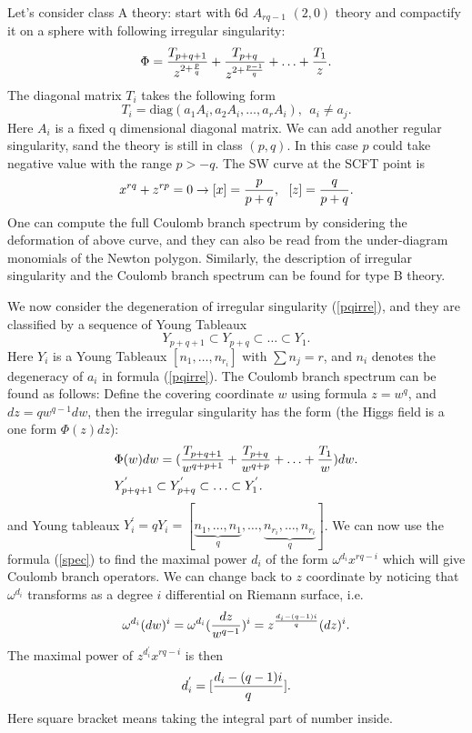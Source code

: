 \documentclass[a4paper,11pt]{article}
\begin{document}
Let's consider class A theory: start with 6d  $A_{rq -1}$ $(2,0)$ theory and compactify it on a sphere with following irregular singularity:
\begin{equation}
\Phi={T_{p+q+1}\over z^{2+{p\over q}}}+{T_{p+q}\over z^{2+{p-1\over q}}}+\ldots+{T_{1}\over z}.
\end{equation}
The diagonal matrix $T_i$ takes the following form
\begin{equation}
T_i=\text{diag}(a_1 A_i, a_2 A_i,\ldots, a_r A_i),~~a_i\neq a_j.
\label{pqirre}
\end{equation}
Here $A_i$ is a fixed q dimensional diagonal matrix. We can add another regular singularity,  sand the theory is 
still in class $(p,q)$. In this case $p$ could take negative value with the range $ p> -q$.  
The SW curve at the SCFT point is 
\begin{equation}
x^{rq}+z^{rp}=0 \rightarrow [x]={p\over p+q},~~[z]={q\over p+q}.
\end{equation}
One can compute the full Coulomb branch spectrum by considering the deformation of above curve, and they can also be read from 
the under-diagram monomials of the Newton polygon.  Similarly, the description of irregular singularity and the Coulomb branch spectrum 
can be found for type B theory. 



We now consider the degeneration of irregular singularity (\ref{pqirre}), and  they are classified by a sequence of Young Tableaux 
\begin{equation}
Y_{p+q+1}\subset Y_{p+q} \subset \ldots \subset Y_1.
\end{equation}
Here $Y_i$ is a  Young Tableaux $[n_1,\ldots, n_{r_i}]$ with $\sum n_j= r$, and $n_i$ denotes the degeneracy of $a_i$ in formula (\ref{pqirre}).  The Coulomb branch spectrum can be found as follows: 
Define the covering coordinate $w$ using formula $z=w^q$, and $dz=qw^{q-1} dw$, then the irregular singularity has the form (the Higgs field is a one form $\Phi(z) dz$):
\begin{align}
& \Phi(w) dw=({T_{p+q+1}\over w^{q+p+1}}+{T_{p+q}\over w^{q+p}}+\ldots+{T_{1}\over w})dw. \nonumber\\
& Y_{p+q+1}^{'}\subset Y_{p+q}^{'} \subset \ldots \subset Y_1^{'}.
\end{align}
and Young tableaux $Y_i^{'}=q Y_i= [\underbrace{n_1,\ldots, n_1}_{q}, \ldots, \underbrace{ n_{r_i},\ldots, n_{r_i}}_{q}]$. 
We can now use the formula (\ref{spec}) to find the maximal power $d_i$ of  the form $\omega^{d_i} x^{ rq -i}$ which will give 
Coulomb branch operators. We can change back to $z$ coordinate by noticing that $\omega^{d_i}$ transforms as a degree $i$ differential on Riemann surface, i.e.
\begin{equation}
\omega^{d_i} (dw)^i=\omega^{d_i} ({dz\over w^{q-1}})^i=z^{d_i-(q-1)i\over q} (dz)^i.
\end{equation}
The maximal power of $z^{d_{i}^{'} }x^{rq -i}$  is then 
\begin{equation}
d_i^{'}=[{d_i-(q-1)i\over q}]. 
\label{origina}
\end{equation}
Here square bracket means taking the integral part of number inside. 
\end{document}
